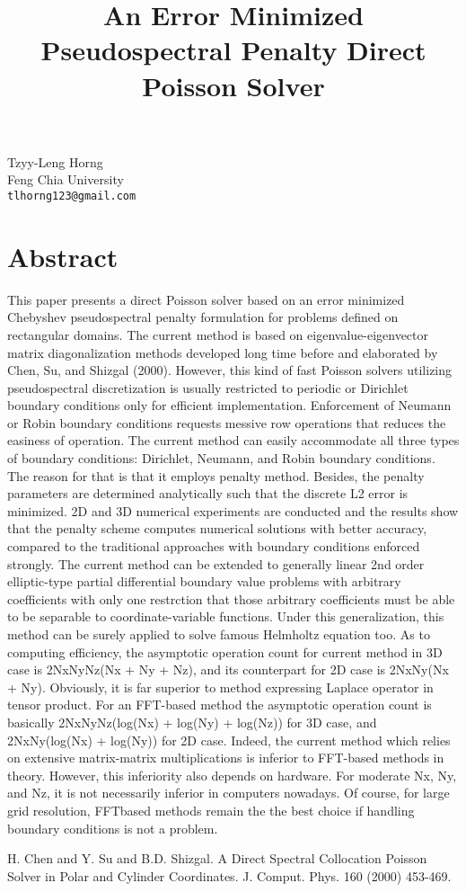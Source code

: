 \title{An Error Minimized Pseudospectral Penalty Direct Poisson Solver}
 \author{} \institute{}
\maketitle
\begin{center}
{\large Tzyy-Leng Horng}\\
Feng Chia University\\
{\tt tlhorng123@gmail.com}

\end{center}

\section*{Abstract}

This paper presents a direct Poisson solver based on an error minimized Chebyshev pseudospectral
penalty formulation for problems defined on rectangular domains. The current method is based
on eigenvalue-eigenvector matrix diagonalization methods developed long time before and elaborated
by Chen, Su, and Shizgal (2000). However, this kind of fast Poisson solvers utilizing pseudospectral
discretization is usually restricted to periodic or Dirichlet boundary conditions only for
efficient implementation. Enforcement of Neumann or Robin boundary conditions requests messive
row operations that reduces the easiness of operation. The current method can easily accommodate all
three types of boundary conditions: Dirichlet, Neumann, and Robin boundary conditions. The reason
for that is that it employs penalty method. Besides, the penalty parameters are determined analytically
such that the discrete L2 error is minimized. 2D and 3D numerical experiments are conducted and the
results show that the penalty scheme computes numerical solutions with better accuracy, compared
to the traditional approaches with boundary conditions enforced strongly. The current method can
be extended to generally linear 2nd order elliptic-type partial differential boundary value problems
with arbitrary coefficients with only one restrction that those arbitrary coefficients must be able to be
separable to coordinate-variable functions. Under this generalization, this method can be surely applied
to solve famous Helmholtz equation too. As to computing efficiency, the asymptotic operation
count for current method in 3D case is 2NxNyNz(Nx + Ny + Nz), and its counterpart for 2D case
is 2NxNy(Nx + Ny). Obviously, it is far superior to method expressing Laplace operator in tensor
product. For an FFT-based method the asymptotic operation count is basically 2NxNyNz(log(Nx) +
log(Ny) + log(Nz)) for 3D case, and 2NxNy(log(Nx) + log(Ny)) for 2D case. Indeed, the current
method which relies on extensive matrix-matrix multiplications is inferior to FFT-based methods
in theory. However, this inferiority also depends on hardware. For moderate Nx, Ny, and Nz, it is not
necessarily inferior in computers nowadays. Of course, for large grid resolution, FFTbased methods
remain the the best choice if handling boundary conditions is not a problem.


\begin{thebibliography}{10}

{\sc H. Chen and Y. Su and B.D. Shizgal}. {A Direct Spectral Collocation Poisson Solver in Polar and Cylinder Coordinates}. J. Comput. Phys. 160 (2000) 453-469.

\end{thebibliography}
